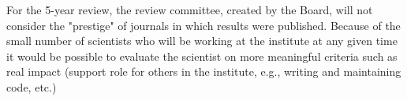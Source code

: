 For the 5-year review, the review committee, created by the Board, will not consider the "prestige" of journals in which results were published. Because of the small number of scientists who will be working at the institute at any given time it would be possible to evaluate the scientist on more meaningful criteria such as real impact (support role for others in the institute, e.g., writing and maintaining code, etc.)

